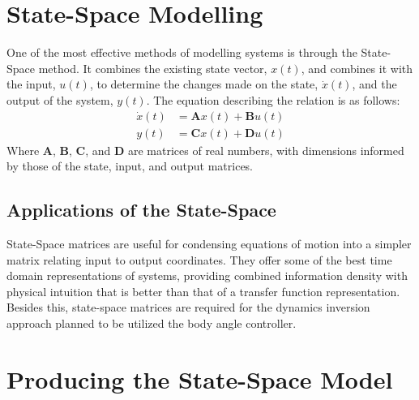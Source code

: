 \documentclass[journal]{IEEEtran}
\begin{document}
\section{State-Space Modelling}

One of the most effective methods of modelling systems is through the State-Space method. 
It combines the existing state vector, $x(t)$, and combines it with the input, $u(t)$, to determine 
the changes made on the state, $\dot{x}(t)$, and the output of the system, $y(t)$. 
The equation describing the relation is as follows:
\begin{align}
\dot{x}(t) &= \mathbf{A}x(t) + \mathbf{B}u(t) \\
y(t) &= \mathbf{C}x(t) + \mathbf{D}u(t)
\end{align}
Where $\mathbf{A}$, $\mathbf{B}$, $\mathbf{C}$, and $\mathbf{D}$ are matrices of real numbers, with dimensions informed 
by those of the state, input, and output matrices.

\subsection{Applications of the State-Space}

State-Space matrices are useful for condensing equations of motion into a simpler matrix relating input to output coordinates. 
They offer some of the best time domain representations of systems, 
providing combined information density with physical intuition that is better than that of a transfer function representation. 
Besides this, state-space matrices are required for the dynamics inversion approach planned to be utilized the body angle controller.

\section{Producing the State-Space Model}
\end{document}
